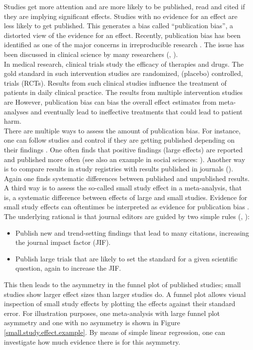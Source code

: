 \documentclass[11pt,a4paper,twoside]{book}\usepackage[]{graphicx}\usepackage[]{color}
\begin{document}
Studies get more attention and are more likely to be published, read and cited if they are implying significant effects. Studies with no evidence for an effect are less likely to get published. This generates a bias called ``publication bias'', a distorted view of the evidence for an effect. Recently, publication bias has been identified as one of the major concerns in irreproducible research \citep{Bishop.2019}. The issue has been discussed in clinical science by many researchers (\citet{pb.clinicalscience1}, \citet{sterne2001}). \\
In medical research, clinical trials study the efficacy of therapies and drugs. The gold standard in such intervention studies are randomized, (placebo) controlled, trials (RCTs). Results from such clinical studies influence the treatment of patients in daily clinical practice. The results from multiple intervention studies are However, publication bias can bias the overall effect estimates from meta-analyses and eventually lead to ineffective treatments that could lead to patient harm. \\
There are multiple ways to assess the amount of publication bias. For instance, one can follow studies and control if they are getting published depending on their findings \citep{publication.fate}. One often finds that positive findings (\ie large effects) are reported and published more often (see also an example in social sciences: \citet{social.sciences.publication.bias}). Another way is to compare results in study registries with results published in journals (\eg \citet{pb.clinicalscience.2013}). Again one finds systematic differences between published and unpublished results. \\
A third way is to assess the so-called small study effect in a meta-analysis, that is, a systematic difference between effects of large and small studies. Evidence for small study effects can oftentimes be interpreted as evidence for publication bias \citep{Egger}. The underlying rational is that journal editors are guided by two simple rules (\citet{excess.significance}, \citet{ioannidis.2019}): 
\begin{itemize}
\item Publish new and trend-setting findings that lead to many citations, increasing the journal impact factor (JIF).
\item Publish large trials that are likely to set the standard for a given scientific question, again to increase the JIF.
\end{itemize}
This then leads to the asymmetry in the funnel plot of published studies; small studies show larger effect sizes than larger studies do. A funnel plot allows visual inspection of small study effects by plotting the effects against their standard error. For illustration purposes, one meta-analysis with large funnel plot asymmetry and one with no asymmetry is shown in Figure \ref{small.study.effect.example}. %
By means of simple linear regression, one can investigate how much evidence there is for this asymmetry. 
\end{document}
